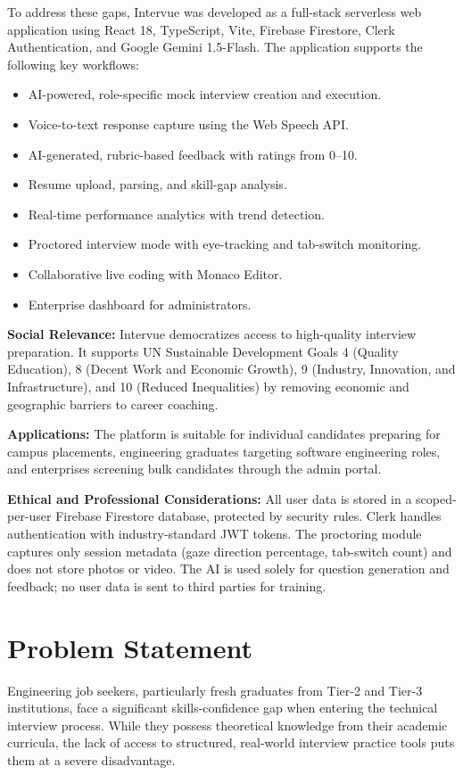 To address these gaps, Intervue was developed as a full-stack serverless web application using
React 18, TypeScript, Vite, Firebase Firestore, Clerk Authentication, and Google Gemini
1.5-Flash. The application supports the following key workflows:
\begin{itemize}
	\item AI-powered, role-specific mock interview creation and execution.
	\item Voice-to-text response capture using the Web Speech API.
	\item AI-generated, rubric-based feedback with ratings from 0--10.
	\item Resume upload, parsing, and skill-gap analysis.
	\item Real-time performance analytics with trend detection.
	\item Proctored interview mode with eye-tracking and tab-switch monitoring.
	\item Collaborative live coding with Monaco Editor.
	\item Enterprise dashboard for administrators.
\end{itemize}

\noindent\textbf{Social Relevance:}
Intervue democratizes access to high-quality interview preparation. It supports UN Sustainable
Development Goals 4 (Quality Education), 8 (Decent Work and Economic Growth), 9 (Industry,
Innovation, and Infrastructure), and 10 (Reduced Inequalities) by removing economic and
geographic barriers to career coaching.

\noindent\textbf{Applications:}
The platform is suitable for individual candidates preparing for campus placements, engineering
graduates targeting software engineering roles, and enterprises screening bulk candidates through
the admin portal.

\noindent\textbf{Ethical and Professional Considerations:}
All user data is stored in a scoped-per-user Firebase Firestore database, protected by security
rules. Clerk handles authentication with industry-standard JWT tokens. The proctoring module
captures only session metadata (gaze direction percentage, tab-switch count) and does not store
photos or video. The AI is used solely for question generation and feedback; no user data is
sent to third parties for training.

\section{Problem Statement}
Engineering job seekers, particularly fresh graduates from Tier-2 and Tier-3 institutions,
face a significant skills-confidence gap when entering the technical interview process.
While they possess theoretical knowledge from their academic curricula, the lack of access
to structured, real-world interview practice tools puts them at a severe disadvantage.

